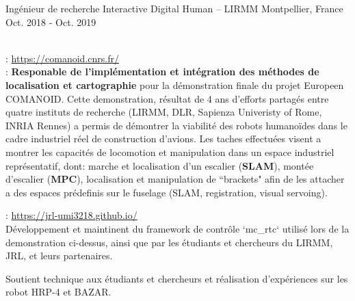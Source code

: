 \begin{cventries}
  \cventry
    {Ingénieur de recherche} %
    {Interactive Digital Human -- LIRMM} %
    {Montpellier, France} %
    {Oct. 2018 - Oct. 2019} %
    {
      \begin{cvitems} %
        \item {}\\
          : \url{https://comanoid.cnrs.fr/}\\
          : \textbf{Responable de l'implémentation et intégration des méthodes de localisation et cartographie} pour la démonstration finale du projet Europeen COMANOID. Cette demonstration, résultat de 4 ans d'efforts partagés entre quatre instituts de recherche (LIRMM, DLR, Sapienza Univeristy of Rome, INRIA Rennes) a permis de démontrer la viabilité des robots humanoïdes dans le cadre industriel réel de construction d'avions. Les taches effectuées visent a montrer les capacités de locomotion et manipulation dans un espace industriel représentatif, dont: marche et localisation d'un escalier (\textbf{SLAM}), montée d'escalier (\textbf{MPC}), localisation et manipulation de ``brackets" afin de les attacher a des espaces prédefinis sur le fuselage (SLAM, registration, visual servoing).
        \item {}: \url{https://jrl-umi3218.github.io/}\\
        Développement et maintinent du framework de contrôle `mc\_rtc` utilisé lors de la demonstration ci-dessus, ainsi que par les étudiants et chercheurs du LIRMM, JRL, et leurs partenaires.
        \item Soutient technique aux étudiants et chercheurs et réalisation d'expériences sur les robot HRP-4 et BAZAR.
      \end{cvitems}
    }




\end{cventries}
